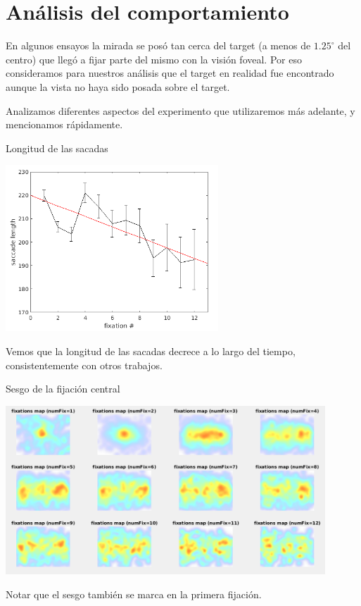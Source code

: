 \documentclass[compress]{beamer}
\begin{document}
\section{Análisis del comportamiento}

\begin{frame}
En algunos ensayos la mirada se posó tan cerca del target (a menos de $1.25^{\circ}$ del centro) que llegó a fijar parte del mismo con la visión foveal. Por eso consideramos para nuestros análisis que el target en realidad fue encontrado aunque la vista no haya sido posada sobre el target.

\bigskip

Analizamos diferentes aspectos del experimento que utilizaremos más adelante, y mencionamos rápidamente.
\end{frame}


\begin{frame}{Longitud de las sacadas}
\begin{center}
\includegraphics[width=0.6\textwidth]{images/mean-sacclen.png}
\end{center}

Vemos que la longitud de las sacadas decrece a lo largo del tiempo, consistentemente con otros trabajos.
\end{frame}

\begin{frame}{Sesgo de la fijación central}
\begin{center}
\includegraphics[width=0.9\textwidth]{images/heatmap-per-fix.png}
\end{center}

Notar que el sesgo también se marca en la primera fijación. \end{frame}
\end{document}

